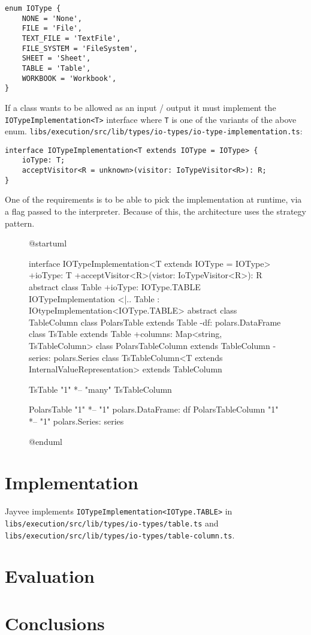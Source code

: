 \begin{lstlisting}[caption=The \lstinline{IOType} enum]
enum IOType {
	NONE = 'None',
	FILE = 'File',
	TEXT_FILE = 'TextFile',
	FILE_SYSTEM = 'FileSystem',
	SHEET = 'Sheet',
	TABLE = 'Table',
	WORKBOOK = 'Workbook',
}
\end{lstlisting}

If a class wants to be allowed as an input / output it must implement the \lstinline{IOTypeImplementation<T>} interface where \lstinline{T} is one of the variants of the above enum.
\lstinline{libs/execution/src/lib/types/io-types/io-type-implementation.ts}:

\begin{lstlisting}
interface IOTypeImplementation<T extends IOType = IOType> {
	ioType: T;
	acceptVisitor<R = unknown>(visitor: IoTypeVisitor<R>): R;
}
\end{lstlisting}

One of the requirements is to be able to pick the implementation at runtime, via a flag passed to the interpreter.
Because of this, the architecture uses the strategy pattern. %

\begin{figure}
	\begin{plantuml}
		@startuml

		interface IOTypeImplementation<T extends IOType = IOType> {
				+ioType: T
				+acceptVisitor<R>(vistor: IoTypeVisitor<R>): R
			}
		abstract class Table {
				+ioType: IOType.TABLE
			}
		IOTypeImplementation <|.. Table : IOtypeImplementation<IOType.TABLE>
		abstract class TableColumn {
			}
		class PolarsTable extends Table {
				-df: polars.DataFrame
			}
		class TsTable extends Table {
				+columns: Map<string, TsTableColumn>
			}
		class PolarsTableColumn extends TableColumn {
				-series: polars.Series
			}
		class TsTableColumn<T extends InternalValueRepresentation> extends TableColumn {
			}



		TsTable "1" *-- "many" TsTableColumn

		PolarsTable "1" *-- "1" polars.DataFrame: df
		PolarsTableColumn "1" *-- "1" polars.Series: series

		@enduml
	\end{plantuml}
\end{figure}

\chapter{Implementation}
\label{chapter:Implementation}

Jayvee implements \lstinline{IOTypeImplementation<IOType.TABLE>} in \lstinline{libs/execution/src/lib/types/io-types/table.ts} and \lstinline{libs/execution/src/lib/types/io-types/table-column.ts}.

\chapter{Evaluation}
\label{chapter:Evaluation}

\chapter{Conclusions}
\label{chapter:Conclusions}

